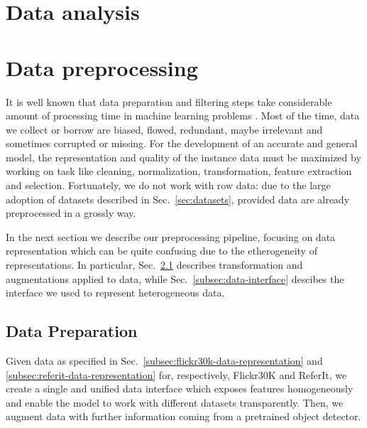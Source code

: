 \section{Data analysis}


\section{Data preprocessing}

It is well known that data preparation and filtering steps take
considerable amount of processing time in machine learning problems
\cite{kotsiantis2006data}. Most of the time, data we collect or borrow
are biased, flowed, redundant, maybe irrelevant and sometimes
corrupted or missing. For the development of an accurate and general
model, the representation and quality of the instance data must be
maximized by working on task like cleaning, normalization,
transformation, feature extraction and selection. Fortunately, we do
not work with row data: due to the large adoption of datasets
described in Sec.~\ref{sec:datasets}, provided data are already
preprocessed in a grossly way.

In the next section we describe our preprocessing pipeline, focusing
on data representation which can be quite confusing due to the
etherogeneity of representations. In particular,
Sec.~\ref{subsec:data-preparation} describes transformation and
augmentations applied to data, while Sec.~\ref{subsec:data-interface}
descibes the interface we used to represent heterogeneous data.

\subsection{Data Preparation}
\label{subsec:data-preparation}

Given data as specified in
Sec.~\ref{subsec:flickr30k-data-representation} and
\ref{subsec:referit-data-representation} for, respectively, Flickr30K
and ReferIt, we create a single and unified data interface which
exposes features homogeneously and enable the model to work with
different datasets transparently. Then, we augment data with further
information coming from a pretrained object detector.

